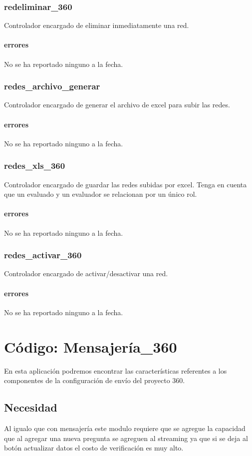 \documentclass[10pt,a4paper]{book}
\begin{document}
	\subsection{redeliminar\_360}
	Controlador encargado de eliminar inmediatamente una red.
	\subsubsection{errores}
	No se ha reportado ninguno a la fecha.

	\subsection{redes\_archivo\_generar}
	Controlador encargado de generar el archivo de excel para subir las redes.
	\subsubsection{errores}
	No se ha reportado ninguno a la fecha.

	\subsection{redes\_xls\_360}
	Controlador encargado de guardar las redes subidas por excel. Tenga en cuenta que un evaluado y un evaluador se relacionan por un único rol.
	\subsubsection{errores}
	No se ha reportado ninguno a la fecha.

	\subsection{redes\_activar\_360}
	Controlador encargado de activar/desactivar una red.
	\subsubsection{errores}
	No se ha reportado ninguno a la fecha.


	\chapter{Código: Mensajería\_360}

	En esta aplicación podremos encontrar las características referentes a los componentes de la configuración de envío del proyecto 360.

	\section{Necesidad}
	Al igualo que con mensajería este modulo requiere que se agregue la capacidad que al agregar una nueva pregunta se agreguen al streaming ya que si se deja al botón actualizar datos el costo de verificación es muy alto.
\end{document}
